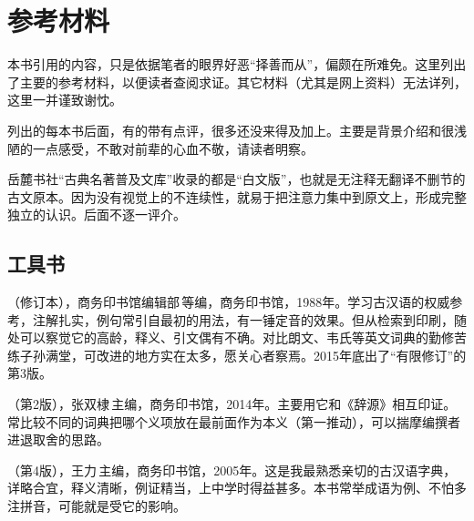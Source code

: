 \chapter*{参\quad 考\quad 材\quad 料}

本书引用的内容，只是依据笔者的眼界好恶“择善而从”，偏颇在所难免。这里列出了主要的参考材料，以便读者查阅求证。其它材料（尤其是网上资料）无法详列，这里一并谨致谢忱。

列出的每本书后面，有的带有点评，很多还没来得及加上。主要是背景介绍和很浅陋的一点感受，不敢对前辈的心血不敬，请读者明察。

岳麓书社“古典名著普及文库”收录的都是“白文版”，也就是无注释无翻译不删节的古文原本。因为没有视觉上的不连续性，就易于把注意力集中到原文上，形成完整独立的认识。后面不逐一评介。


\lypdfbookmark\section*{工具书}

（修订本），商务印书馆编辑部\,等编，商务印书馆，1988年。学习古汉语的权威参考，注解扎实，例句常引自最初的用法，有一锤定音的效果。但从检索到印刷，随处可以察觉它的高龄，释义、引文偶有不确。对比朗文、韦氏等英文词典的勤修苦练子孙满堂，可改进的地方实在太多，愿关心者察焉。2015年底出了“有限修订”的第3版。

（第2版），张双棣\,主编，商务印书馆，2014年。主要用它和《辞源》相互印证。常比较不同的词典把哪个义项放在最前面作为本义（第一推动），可以揣摩编撰者进退取舍的思路。

（第4版），王力\,主编，商务印书馆，2005年。这是我最熟悉亲切的古汉语字典，详略合宜，释义清晰，例证精当，上中学时得益甚多。本书常举成语为例、不怕多注拼音，可能就是受它的影响。

